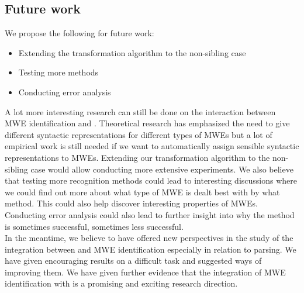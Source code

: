 \documentclass[output=paper]{langsci/langscibook}
\begin{document}
\subsection{Future work}
We propose the following for future work:
\begin{itemize}
    \setlength\itemsep{0pt}
    \item Extending the transformation algorithm to the non-sibling case
    \item Testing more  methods
    \item Conducting error analysis
\end{itemize}
A lot more interesting research can still be done on the interaction between MWE identification and . Theoretical research has emphasized the need to give different syntactic representations for different types of MWEs but a lot of empirical work is still needed if we want to automatically assign sensible syntactic representations to MWEs. Extending our transformation algorithm to the non-sibling case would allow conducting more extensive experiments. We also believe that testing more recognition methods could lead to interesting discussions where we could find out more about what type of MWE is dealt best with by what method. This could also help discover interesting properties of MWEs. Conducting error analysis could also lead to further insight into why the method is sometimes successful, sometimes less successful. \\
\indent In the meantime, we believe to have offered new perspectives in the study of the integration between  and MWE identification especially in relation to  parsing. We have given encouraging results on a difficult task and suggested ways of improving them. We have given further evidence that the integration of MWE identification with  is a promising and exciting research direction.
 
\printbibliography[heading=subbibliography,notkeyword=this]
\end{document}

